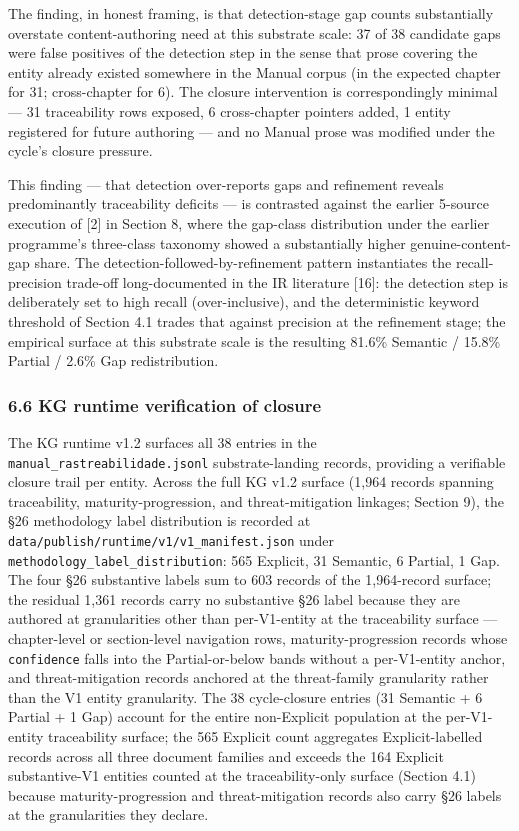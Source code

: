 \documentclass[
]{article}
\begin{document}
The finding, in honest framing, is that detection-stage gap counts
substantially overstate content-authoring need at this substrate scale:
37 of 38 candidate gaps were false positives of the detection step in
the sense that prose covering the entity already existed somewhere in
the Manual corpus (in the expected chapter for 31; cross-chapter for 6).
The closure intervention is correspondingly minimal --- 31 traceability
rows exposed, 6 cross-chapter pointers added, 1 entity registered for
future authoring --- and no Manual prose was modified under the cycle's
closure pressure.

This finding --- that detection over-reports gaps and refinement reveals
predominantly traceability deficits --- is contrasted against the
earlier 5-source execution of {[}2{]} in Section 8, where the gap-class
distribution under the earlier programme's three-class taxonomy showed a
substantially higher genuine-content-gap share. The
detection-followed-by-refinement pattern instantiates the
recall-precision trade-off long-documented in the IR literature
{[}16{]}: the detection step is deliberately set to high recall
(over-inclusive), and the deterministic keyword threshold of Section 4.1
trades that against precision at the refinement stage; the empirical
surface at this substrate scale is the resulting 81.6\% Semantic /
15.8\% Partial / 2.6\% Gap redistribution.

\subsubsection{6.6 KG runtime verification of
closure}\label{kg-runtime-verification-of-closure}

The KG runtime v1.2 surfaces all 38 entries in the
\texttt{manual\_rastreabilidade.jsonl} substrate-landing records,
providing a verifiable closure trail per entity. Across the full KG v1.2
surface (1,964 records spanning traceability, maturity-progression, and
threat-mitigation linkages; Section 9), the §26 methodology label
distribution is recorded at
\texttt{data/publish/runtime/v1/v1\_manifest.json} under
\texttt{methodology\_label\_distribution}: 565 Explicit, 31 Semantic, 6
Partial, 1 Gap. The four §26 substantive labels sum to 603 records of
the 1,964-record surface; the residual 1,361 records carry no
substantive §26 label because they are authored at granularities other
than per-V1-entity at the traceability surface --- chapter-level or
section-level navigation rows, maturity-progression records whose
\texttt{confidence} falls into the Partial-or-below bands without a
per-V1-entity anchor, and threat-mitigation records anchored at the
threat-family granularity rather than the V1 entity granularity. The 38
cycle-closure entries (31 Semantic + 6 Partial + 1 Gap) account for the
entire non-Explicit population at the per-V1-entity traceability
surface; the 565 Explicit count aggregates Explicit-labelled records
across all three document families and exceeds the 164 Explicit
substantive-V1 entities counted at the traceability-only surface
(Section 4.1) because maturity-progression and threat-mitigation records
also carry §26 labels at the granularities they declare.
\end{document}
